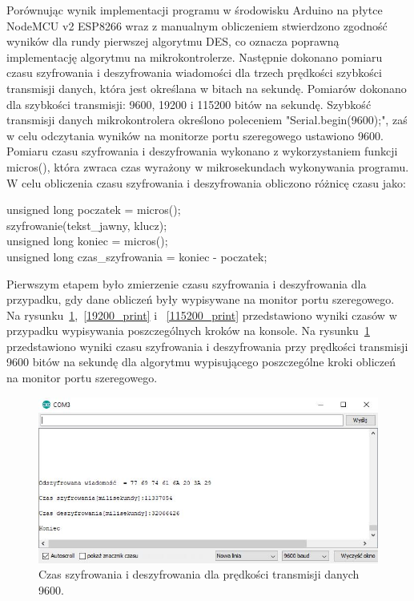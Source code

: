 \documentclass[12p]{article}
\begin{document}
Porównując wynik implementacji programu w środowisku Arduino na płytce NodeMCU v2 ESP8266 wraz z manualnym obliczeniem stwierdzono zgodność wyników dla rundy pierwszej algorytmu DES, co oznacza poprawną implementację algorytmu na mikrokontrolerze. Następnie dokonano pomiaru czasu szyfrowania i deszyfrowania wiadomości dla trzech prędkości szybkości transmisji danych, która jest określana w bitach na sekundę. Pomiarów dokonano dla szybkości transmisji: 9600, 19200 i 115200 bitów na sekundę. Szybkość transmisji danych mikrokontrolera określono poleceniem "Serial.begin(9600);", zaś w celu odczytania wyników na monitorze portu szeregowego ustawiono 9600. Pomiaru czasu szyfrowania i deszyfrowania wykonano z wykorzystaniem funkcji micros(), która zwraca czas wyrażony w mikrosekundach wykonywania programu. W celu obliczenia czasu szyfrowania i deszyfrowania obliczono różnicę czasu jako:\\
\begin{center}
unsigned long poczatek = micros();\\
szyfrowanie(tekst\_jawny, klucz);\\
unsigned long koniec = micros();\\
unsigned long czas\_szyfrowania = koniec - poczatek;\\
\end{center}

Pierwszym etapem było zmierzenie czasu szyfrowania i deszyfrowania dla przypadku, gdy dane obliczeń były wypisywane na monitor portu szeregowego. Na rysunku~\ref{9600_print},~\ref{19200_print} i ~\ref{115200_print} przedstawiono wyniki czasów w przypadku wypisywania poszczególnych kroków na konsole. Na rysunku~\ref{9600_print} przedstawiono wyniki czasu szyfrowania i deszyfrowania przy prędkości transmisji 9600 bitów na sekundę dla algorytmu wypisującego poszczególne kroki obliczeń na monitor portu szeregowego.

\begin{figure}[H]
\centering
\includegraphics[width=12cm]{szy_desz_9600_print.jpg}
\caption{Czas szyfrowania i deszyfrowania dla prędkości transmisji danych 9600.}\label{9600_print}
\end{figure}
\end{document}

